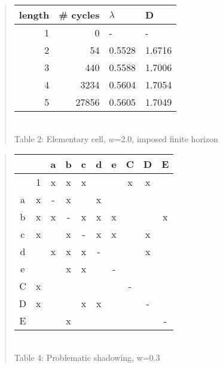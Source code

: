 \begin{quote} \begin{center}
\begin{tabular}{|r|r|l|l|}
\hline
length & \# cycles & $\lambda$ & D \\ \hline\hline
1      & 0      &   -    &    - \\
2 &     54      & 0.5528 &  1.6716\\
3 &    440      & 0.5588 &  1.7006\\
4 &   3234      & 0.5604 &  1.7054\\
5 &  27856      & 0.5605 &  1.7049\\ \hline
\end{tabular}\\[10pt]
{Table 2: Elementary cell, $w$=2.0, imposed finite horizon}
\end{center}\end{quote}

\begin{quote} \begin{center}
\begin{tabular}{|c|c||c|c|c|c|c|c|c|c|}
\hline
  &   & a & b & c & d & e & C & D & E \\ \hline
  & 1 & x & x & x &   &   & x & x &   \\ \hline\hline
a & x & - & x &   & x &   &   &   &   \\
b & x & x & - & x & x & x &   &   & x \\
c & x &   & x & - & x & x &   & x &   \\
d &   & x & x & x & - &   &   & x &   \\
e &   &   & x & x &   & - &   &   &   \\
C & x &   &   &   &   &   & - &   &   \\
D & x &   &   & x & x &   &   & - &   \\
E &   &   & x &   &   &   &   &   & - \\ \hline
\end{tabular}\\[10pt]
{Table 4:  Problematic shadowing, w=0.3}
\end{center}\end{quote}

